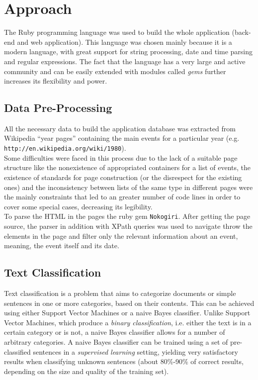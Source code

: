 \documentclass{llncs}
\begin{document}
\section{Approach}
\label{sec:approach}

The Ruby programming language was used to build the whole application (back-end and web application). This language was chosen mainly because it is a modern language, with great support for string processing, date and time parsing and regular expressions. The fact that the language has a very large and active community and can be easily extended with modules called \textit{gems} further increases its flexibility and power.

\subsection{Data Pre-Processing}

All the necessary data to build the application database was extracted from Wikipedia ``year pages'' containing the main events for a particular year (e.g. \verb!http://en.wikipedia.org/wiki/1980!).\\

Some difficulties were faced in this process due to the lack of a suitable page structure like the nonexistence of appropriated containers for a list of events, the existence of standards for page construction (or the disrespect for the existing ones) and the inconsistency between lists of the same type in different pages were the mainly constraints that led to an greater number of code lines in order to cover some special cases, decreasing its legibility.\\

To parse the HTML in the pages the ruby gem \verb!Nokogiri!. After getting the page source, the parser in addition with XPath queries was used to navigate throw the elements in the page and filter only the relevant information about an event, meaning, the event itself and its date.


\subsection{Text Classification}
\label{subsec:approach:text-classification}

Text classification is a problem that aims to categorize documents or simple sentences in one or more categories, based on their contents. This can be achieved using either Support Vector Machines or a naive Bayes classifier. Unlike Support Vector Machines, which produce a \textit{binary classification}, i.e. either the text is in a certain category or is not, a naive Bayes classifier allows for a number of arbitrary categories. A naive Bayes classifier can be trained using a set of pre-classified sentences in a \textit{supervised learning} setting, yielding very satisfactory results when classifying unknown sentences (about 80\%-90\% of correct results, depending on the size and quality of the training set).\cite{russel}\\
\end{document}
